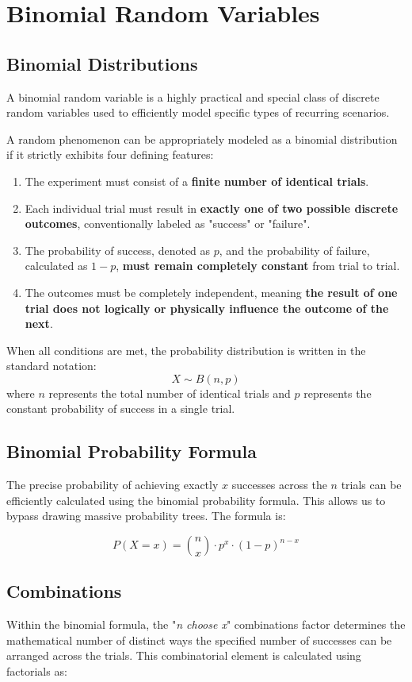 \documentclass[12pt]{scrartcl}
\begin{document}
\section{Binomial Random Variables}

\subsection{Binomial Distributions}
A binomial random variable is a highly practical and special class of discrete random variables used to efficiently model specific types of recurring scenarios. 

A random phenomenon can be appropriately modeled as a binomial distribution if it strictly exhibits four defining features:
\begin{enumerate}
    \item The experiment must consist of a \textbf{finite number of identical trials}. 
    \item Each individual trial must result in \textbf{exactly one of two possible discrete outcomes}, conventionally labeled as "success" or "failure".
    \item The probability of success, denoted as $p$, and the probability of failure, calculated as $1 − p$, \textbf{must remain completely constant} from trial to trial.
    \item The outcomes must be completely independent, meaning \textbf{the result of one trial does not logically or physically influence the outcome of the next}.
\end{enumerate}

When all conditions are met, the probability distribution is written in the standard notation:
\[
X \sim B(n,p)
\]
where $n$ represents the total number of identical trials and $p$ represents the constant probability of success in a single trial.

\newpage
\subsection{Binomial Probability Formula}
The precise probability of achieving exactly $x$ successes across the $n$ trials can be efficiently calculated using the binomial probability formula. This allows us to bypass drawing massive probability trees. The formula is:

\[
P(X = x) = {n \choose x} \cdot p^{x} \cdot (1 - p)^{n-x}
\]

\subsection{Combinations}
Within the binomial formula, the "\textit{n choose x}" combinations factor determines the mathematical number of distinct ways the specified number of successes can be arranged across the trials. This combinatorial element is calculated using factorials as:
\end{document}
